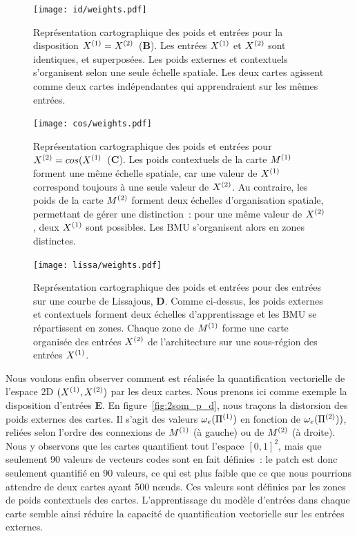 \documentclass[../main]{subfiles}
\begin{document}
\begin{figure}
\begin{minipage}{\textwidth}
	\centering\texttt{[image: id/weights.pdf]}
	\vspace{-0.3cm}
	\caption{Représentation cartographique des poids et entrées pour la disposition $X^{({1})} = X^{({2})}$~(\textbf{B}). Les entrées $X^{({1})}$ et $X^{({2})}$ sont identiques, et superposées.
	Les poids externes et contextuels s'organisent selon une seule échelle spatiale.
	Les deux cartes agissent comme deux cartes indépendantes qui apprendraient sur les mêmes entrées. \label{fig:id_results}}
	\centering\texttt{[image: cos/weights.pdf]}
	\vspace{-0.3cm}
\caption{Représentation cartographique des poids et entrées pour $X^{({2})} = cos(X^{({1})}$~(\textbf{C}). Les poids contextuels de la carte $M^{({1})}$ forment une même échelle spatiale, car une valeur de $X^{({1})}$ correspond toujours à une seule valeur de $X^{({2})}$. Au contraire, les poids de la carte $M^{({2})}$ forment deux échelles d'organisation spatiale, permettant de gérer une distinction~: pour une même valeur de $X^{({2})}$, deux $X^{({1})}$ sont possibles. Les BMU s'organisent alors en zones distinctes.
\label{fig:cos_results}}
	\centering\texttt{[image: lissa/weights.pdf]}
	\vspace{-0.3cm}
	\caption{Représentation cartographique des poids et entrées pour des entrées sur une courbe de Lissajous, \textbf{D}.
	Comme ci-dessus, les poids externes et contextuels forment deux échelles d'apprentissage et les BMU se répartissent en zones.
	Chaque zone de $M^{({1})}$ forme une carte organisée des entrées $X^{({2})}$ de l'architecture sur une sous-région des entrées $X^{({1})}$. \label{fig:lissa}}
\end{minipage}
\end{figure}

Nous voulons enfin observer comment est réalisée la quantification vectorielle de l'espace 2D $(X^{({1})}, X^{({2})})$ par les deux cartes. Nous prenons ici comme exemple la disposition d'entrées \textbf{E}.
En figure~\ref{fig:2som_p_d}, nous traçons la distorsion des poids externes des cartes. Il s'agit des valeurs $\omega_e(\Pi^{({1})})$ en fonction de $\omega_e(\Pi^{({2})}))$, reliées selon l'ordre des connexions de $M^{({1})}$ (à gauche) ou de $M^{({2})}$ (à droite).
Nous y observons que les cartes quantifient tout l'espace $[0,1]^2$, mais que seulement 90 valeurs de vecteurs codes sont en fait définies~: le patch est donc seulement quantifié en 90 valeurs, ce qui est plus faible que ce que nous pourrions attendre de deux cartes ayant 500 n\oe{}uds. 
Ces valeurs sont définies par les zones de poids contextuels des cartes. L'apprentissage du modèle d'entrées dans chaque carte semble ainsi réduire la capacité de quantification vectorielle sur les entrées externes.
\end{document}
